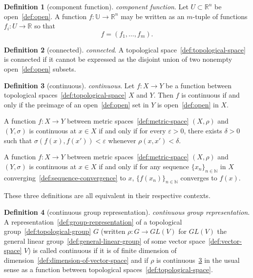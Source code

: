 \documentclass[12pt,a4paper]{article}
\theoremstyle{definition}
\newtheorem{definition}{Definition}
\begin{document}
\begin{definition}[component function]\label{def:component-function}
\emph{component function}. Let $U \subset \mathbb R^n$ be open~\ref{def:open}. A function $f:\mathbb U \to \mathbb R^n$ may be written as an $m$-tuple of functions $f_i:U\to \mathbb R$ so that $$f=(f_1,\dots,f_m).$$
\end{definition}

\begin{definition}[connected]\label{def:connected}
\emph{connected}. A topological space~\ref{def:topological-space} is connected if it cannot be expressed as the disjoint union of two nonempty open~\ref{def:open} subsets.
\end{definition}

\begin{definition}[continuous]\label{def:continuous}
\emph{continuous}. Let $f: X\to Y$ be a function between topological spaces~\ref{def:topological-space} $X$ and $Y$. Then $f$ is continuous if and only if the preimage of an open~\ref{def:open} set in $Y$ is open~\ref{def:open} in $X$.

A function $f: X\to Y$ between metric spaces~\ref{def:metric-space} $(X,\rho)$ and $(Y,\sigma)$ is continuous at $x\in X$ if and only if for every $\varepsilon > 0$, there exists $\delta> 0$ such that $\sigma(f(x),f(x')) < \varepsilon$ whenever $\rho(x,x') < \delta$.

A function $f: X\to Y$ between metric spaces~\ref{def:metric-space} $(X,\rho)$ and $(Y,\sigma)$ is continuous at $x\in X$ if and only if for any sequence $\{x_n\}_{n\in\mathbb N}$ in $X$ converging~\ref{def:sequence-convergence} to $x$, $\{f(x_n)\}_{n\in \mathbb N}$ converges to $f(x)$.

These three definitions are all equivalent in their respective contexts.
\end{definition}

\begin{definition}[continuous group representation]\label{def:continuous-group-representation}
\emph{continuous group representation}. A representation~\ref{def:group-representation} of a topological group~\ref{def:topological-group} $G$ (written $\rho:G\to GL(V)$ for $GL(V)$  the general linear group~\ref{def:general-linear-group} of some vector space~\ref{def:vector-space} $V$) is called continuous if it is of finite dimension of dimension~\ref{def:dimension-of-vector-space} and if $\rho$ is continuous~\ref{def:continuous} in the usual sense as a function between topological spaces~\ref{def:topological-space}.
\end{definition}
\end{document}
